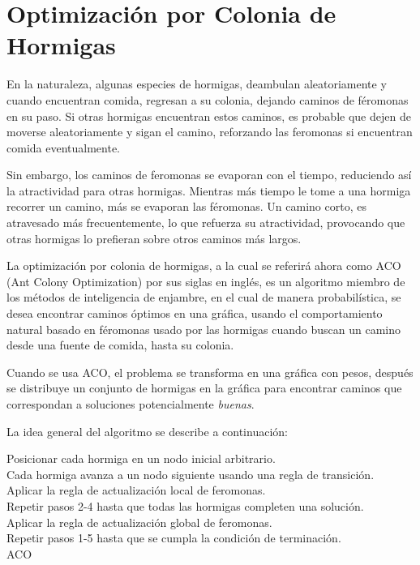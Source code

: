 \documentclass[12pt, letterpaper]{article}
\begin{document}
\section{Optimización por Colonia de Hormigas}
En la naturaleza, algunas especies de hormigas, deambulan aleatoriamente y cuando encuentran comida, regresan a su colonia, dejando caminos de féromonas en su paso. Si otras hormigas encuentran estos caminos, es probable que dejen de moverse aleatoriamente y sigan el camino, reforzando las feromonas si encuentran comida eventualmente.
\par
Sin embargo, los caminos de feromonas se evaporan con el tiempo, reduciendo así la atractividad para otras hormigas. Mientras más tiempo le tome a una hormiga recorrer un camino, más se evaporan las féromonas. Un camino corto, es atravesado más frecuentemente, lo que refuerza su atractividad, provocando que otras hormigas lo prefieran sobre otros caminos más largos.
\par
La optimización por colonia de hormigas, a la cual se referirá ahora como ACO (Ant Colony Optimization) por sus siglas en inglés, es un algoritmo miembro de los métodos de inteligencia de enjambre, en el cual de manera probabilística, se desea encontrar caminos óptimos en una gráfica, usando el comportamiento natural basado en féromonas usado por las hormigas cuando buscan un camino desde una fuente de comida, hasta su colonia.
\par
Cuando se usa ACO, el problema se transforma en una gráfica con pesos, después se distribuye un conjunto de hormigas en la gráfica para encontrar caminos que correspondan a soluciones potencialmente \textit{buenas}.
\par
La idea general del algoritmo se describe a continuación:

\bigskip
\LinesNumbered
\begin{algorithm}[H]
Posicionar cada hormiga en un nodo inicial arbitrario.\\
Cada hormiga avanza a un nodo siguiente usando una regla de transición.\\
Aplicar la regla de actualización local de feromonas.\\
Repetir pasos 2-4 hasta que todas las hormigas completen una solución.\\
Aplicar la regla de actualización global de feromonas.\\
Repetir pasos 1-5 hasta que se cumpla la condición de terminación.\\
\caption{ACO}
\label{proc:1}
\end{algorithm}
\LinesNotNumbered
\bigskip
\end{document}

